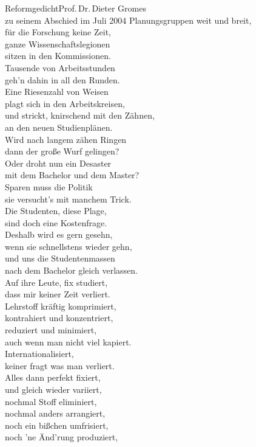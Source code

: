 \begin{lied*}{Reformgedicht}{Prof.\,Dr.\,Dieter Gromes\\zu seinem Abschied im Juli 2004}
Planungsgruppen weit und breit,\\
für die Forschung keine Zeit,\\
ganze Wissenschaftslegionen\\
sitzen in den Kommissionen.\\
Tausende von Arbeitsstunden\\
geh'n dahin in all den Runden.\\
Eine Riesenzahl von Weisen\\
plagt sich in den Arbeitskreisen,\\
und strickt, knirschend mit den Zähnen,\\
an den neuen Studienplänen.\\

Wird nach langem zähen Ringen\\
dann der große Wurf gelingen?\\
Oder droht nun ein Desaster\\
mit dem Bachelor und dem Master?\\

Sparen muss die Politik\\
sie versucht's mit manchem Trick.\\
Die Studenten, diese Plage,\\
sind doch eine Kostenfrage.\\
Deshalb wird es gern gesehn,\\
wenn sie schnellstens wieder gehn,\\
und uns die Studentenmassen\\
nach dem Bachelor gleich verlassen.\\

Auf ihre Leute, fix studiert,\\
dass mir keiner Zeit verliert.\\
Lehrstoff kräftig komprimiert,\\
kontrahiert und konzentriert,\\
reduziert und minimiert,\\
auch wenn man nicht viel kapiert.\\

Internationalisiert,\\
keiner fragt was man verliert.\\
Alles dann perfekt fixiert,\\
und gleich wieder variiert,\\
nochmal Stoff eliminiert,\\
nochmal anders arrangiert,\\
noch ein bißchen umfrisiert,\\
noch 'ne Änd'rung produziert,\\


\end{lied*}
